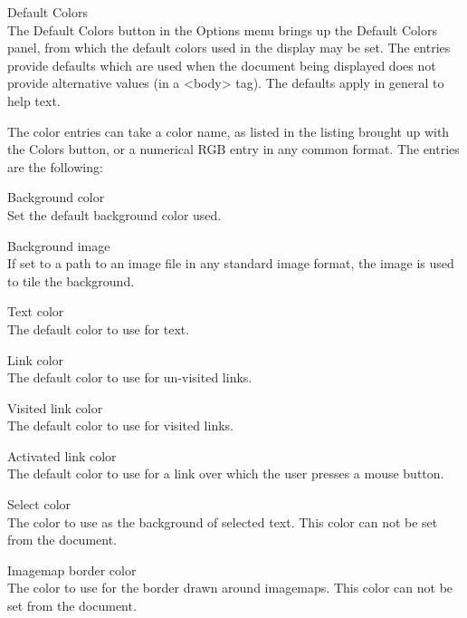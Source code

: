 \begin{description}
\item{\cb Default Colors}\\
The {\cb Default Colors} button in the {\cb Options} menu brings up
the {\cb Default Colors} panel, from which the default colors used in
the display may be set.  The entries provide defaults which are used
when the document being displayed does not provide alternative values
(in a {\vt <body>} tag).  The defaults apply in general to help text.

The color entries can take a color name, as listed in the listing
brought up with the {\cb Colors} button, or a numerical RGB entry in
any common format.  The entries are the following:

\begin{description}
\item{\cb Background color}\\
Set the default background color used.

\item{\cb Background image}\\
If set to a path to an image file in any standard image format, the
image is used to tile the background.

\item{\cb Text color}\\
The default color to use for text.

\item{\cb Link color}\\
The default color to use for un-visited links.

\item{\cb Visited link color}\\
The default color to use for visited links.

\item{\cb Activated link color}\\
The default color to use for a link over which the user presses a
mouse button.  

\item{\cb Select color}\\
The color to use as the background of selected text.  This color can
not be set from the document.

\item{\cb Imagemap border color}\\
The color to use for the border drawn around imagemaps.  This color
can not be set from the document.
\end{description}


\end{description}
